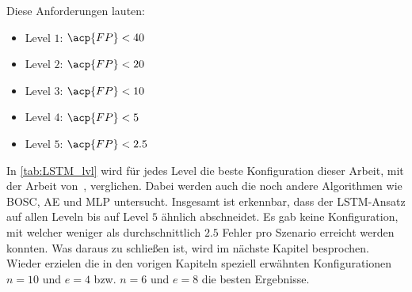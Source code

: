     Diese Anforderungen lauten:
    \begin{itemize}
        \item Level $1$: $\acp{FP}<40$
        \item Level $2$: $\acp{FP}<20$
        \item Level $3$: $\acp{FP}<10$
        \item Level $4$: $\acp{FP}<5$
        \item Level $5$: $\acp{FP}<2.5$
    \end{itemize}
    In \autoref{tab:LSTM_lvl} wird für jedes Level die beste Konfiguration dieser Arbeit, mit der Arbeit von~\cite{IDSTHREADGRIMMER2021}, verglichen.
    Dabei werden auch die noch andere Algorithmen wie \ac{BOSC}, \ac{AE} und \ac{MLP} untersucht.
    Insgesamt ist erkennbar, dass der \ac{LSTM}-Ansatz auf allen Leveln bis auf Level $5$ ähnlich abschneidet.
    Es gab keine Konfiguration, mit welcher weniger als durchschnittlich $2.5$ Fehler pro Szenario erreicht werden konnten.
    Was daraus zu schließen ist, wird im nächste Kapitel besprochen.
    Wieder erzielen die in den vorigen Kapiteln speziell erwähnten Konfigurationen $n=10$ und $e=4$ bzw. $n=6$ und $e=8$ die besten Ergebnisse.

